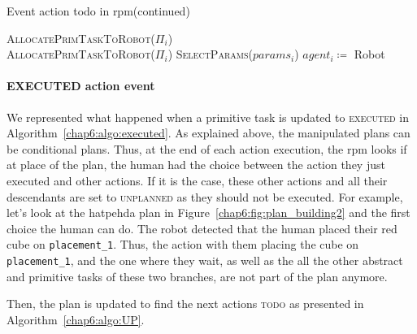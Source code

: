 \documentclass[a4paper,11pt,twoside]{StyleThese}
\begin{document}
\begin{algorithm}[!htb]
	\ContinuedFloat
	\caption{Event action todo in \acrshort{rpm}(continued)}
	\begin{algorithmic}
			\State \textsc{AllocatePrimTaskToRobot($\Pi_i$)}
		\Else
			\\
			\EndWhile
				\State \textsc{AllocatePrimTaskToRobot($\Pi_i$)}
			\EndIf
		\EndIf
	\EndFunction
	\Statex
		\State \textsc{SelectParams($params_i$)}
		\State $agent_i \coloneqq$ Robot
	\EndFor
	\EndFunction
	\end{algorithmic}
\end{algorithm}

\thispagestyle{example}
\paragraph{EXECUTED action event}
We represented what happened when a primitive task is updated to \textsc{executed} in Algorithm~\ref{chap6:algo:executed}. As explained above, the manipulated plans can be conditional plans. Thus, at the end of each action execution, the \acrshort{rpm} looks if at place of the plan, the human had the choice between the action they just executed and other actions. If it is the case, these other actions and all their descendants are set to \textsc{unplanned} as they should not be executed. For example, let's look at the \acrshort{hatpehda} plan in Figure~\ref{chap6:fig:plan_building2} and the first choice the human can do. The robot detected that the human placed their red cube on \verb'placement_1'. Thus, the action with them placing the cube on  \verb'placement_1', and the one where they wait, as well as the all the other abstract and primitive tasks of these two branches, are not part of the plan anymore. 

\thispagestyle{example}
Then, the plan is updated to find the next actions \textsc{todo} as presented in Algorithm~\ref{chap6:algo:UP}.
\end{document}

